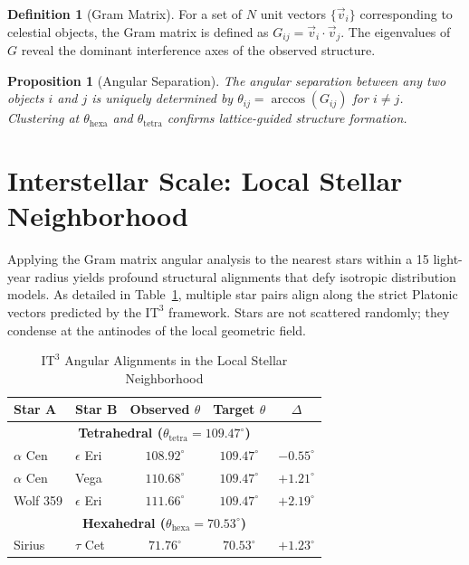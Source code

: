 \documentclass[12pt,a4paper,oneside]{article}
\theoremstyle{plain}
\newtheorem{proposition}[theorem]{Proposition}
\theoremstyle{definition}
\newtheorem{definition}[theorem]{Definition}
\theoremstyle{remark}
\newcommand{\ITthree}{\mathrm{IT}^3}
\begin{document}
\begin{definition}[Gram Matrix]
\label{def:gram}
For a set of $N$ unit vectors $\{\vec{v}_i\}$ corresponding to celestial objects, the Gram matrix is defined as $G_{ij} = \vec{v}_i \cdot \vec{v}_j$. The eigenvalues of $G$ reveal the dominant interference axes of the observed structure.
\end{definition}

\begin{proposition}[Angular Separation]
\label{prop:angle}
The angular separation between any two objects $i$ and $j$ is uniquely determined by $\theta_{ij} = \arccos(G_{ij})$ for $i \neq j$. Clustering at $\theta_{\mathrm{hexa}}$ and $\theta_{\mathrm{tetra}}$ confirms lattice-guided structure formation.
\end{proposition}

\section{Interstellar Scale: Local Stellar Neighborhood}
\label{sec:interstellar}

Applying the Gram matrix angular analysis to the nearest stars within a 15 light-year radius yields profound structural alignments that defy isotropic distribution models. As detailed in Table~\ref{tab:stellar}, multiple star pairs align along the strict Platonic vectors predicted by the \texorpdfstring{$\ITthree$}{IT3} framework. Stars are not scattered randomly; they condense at the antinodes of the local geometric field.

\begin{table}[htbp]
\centering
\caption{\texorpdfstring{$\ITthree$}{IT3} Angular Alignments in the Local Stellar Neighborhood}
\label{tab:stellar}
\begin{tabular}{llccc}
\toprule
\textbf{Star A} & \textbf{Star B} & \textbf{Observed $\theta$} & \textbf{Target $\theta$} & \textbf{$\Delta$} \\
\midrule
\multicolumn{5}{c}{\textbf{Tetrahedral ($\theta_{\mathrm{tetra}} = 109.47^\circ$)}} \\
$\alpha$ Cen & $\epsilon$ Eri & $108.92^\circ$ & $109.47^\circ$ & $-0.55^\circ$ \\
$\alpha$ Cen & Vega & $110.68^\circ$ & $109.47^\circ$ & $+1.21^\circ$ \\
Wolf 359 & $\epsilon$ Eri & $111.66^\circ$ & $109.47^\circ$ & $+2.19^\circ$ \\
\midrule
\multicolumn{5}{c}{\textbf{Hexahedral ($\theta_{\mathrm{hexa}} = 70.53^\circ$)}} \\
Sirius & $\tau$ Cet & $71.76^\circ$ & $70.53^\circ$ & $+1.23^\circ$ \\
\bottomrule
\end{tabular}
\end{table}
\end{document}
